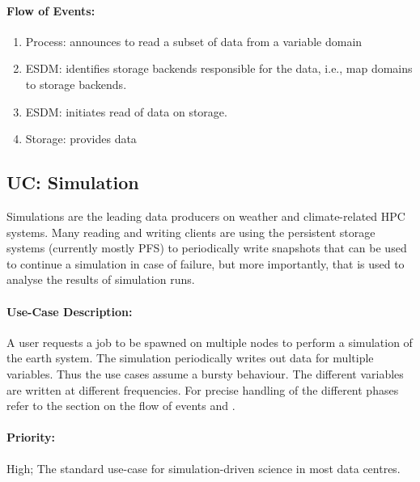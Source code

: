 \paragraph{Flow of Events:}
\begin{enumerate}
	\item Process: announces to read a subset of data from a variable domain
	\item ESDM: identifies storage backends responsible for the data, i.e., map domains to storage backends.
	\item ESDM: initiates read of data on storage.
	\item Storage: provides data
\end{enumerate}






\subsection{UC: Simulation}
\label{uc: simulation}

Simulations are the leading data producers on weather and climate-related HPC systems.
Many reading and writing clients are using the persistent storage systems (currently mostly PFS) to periodically write snapshots that can be used to continue a simulation in case of failure, but more importantly, that is used to analyse the results of simulation runs.

\paragraph{Use-Case Description:}
A user requests a job to be spawned on multiple nodes to perform a simulation of the earth system.
The simulation periodically writes out data for multiple variables. Thus the use cases assume a bursty behaviour.
The different variables are written at different frequencies.
For precise handling of the different phases refer to the section on the flow of events and .



\paragraph{Priority:}
High; The standard use-case for simulation-driven science in most data centres.

